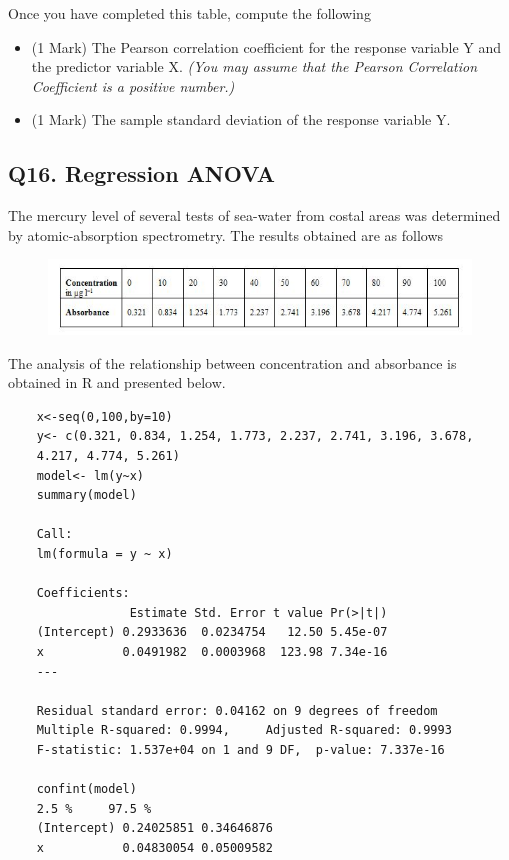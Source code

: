 \documentclass[a4paper,12pt]{article}
\begin{document}
Once you have completed this table, compute the following
\begin{itemize}
	\item (1 Mark) The Pearson correlation coefficient for the response variable Y and the predictor variable X.\textit{ (You may assume that the Pearson Correlation Coefficient is a positive number.)}
	\item (1 Mark) The sample standard deviation of the response variable Y.
\end{itemize}
\newpage
\subsection*{Q16. Regression ANOVA}
The mercury level of several tests of sea-water from costal areas was determined by atomic-absorption spectrometry. The results obtained are as follows

\begin{figure}[h!]
	\centering
	\includegraphics[width=1.1\linewidth]{image/regressionData}
\end{figure}

The analysis of the relationship between concentration and absorbance is obtained in R and presented below. 
\begin{framed}
	\begin{verbatim}
	x<-seq(0,100,by=10)
	y<- c(0.321, 0.834, 1.254, 1.773, 2.237, 2.741, 3.196, 3.678, 
	4.217, 4.774, 5.261)
	model<- lm(y~x)
	summary(model)
	
	Call:
	lm(formula = y ~ x)
	
	Coefficients:
	             Estimate Std. Error t value Pr(>|t|)    
	(Intercept) 0.2933636  0.0234754   12.50 5.45e-07 
	x           0.0491982  0.0003968  123.98 7.34e-16 
	---
	
	Residual standard error: 0.04162 on 9 degrees of freedom
	Multiple R-squared: 0.9994,     Adjusted R-squared: 0.9993 
	F-statistic: 1.537e+04 on 1 and 9 DF,  p-value: 7.337e-16 
	
	confint(model)
	2.5 %     97.5 %
	(Intercept) 0.24025851 0.34646876
	x           0.04830054 0.05009582
	
	\end{verbatim}
\end{framed}
\end{document}
